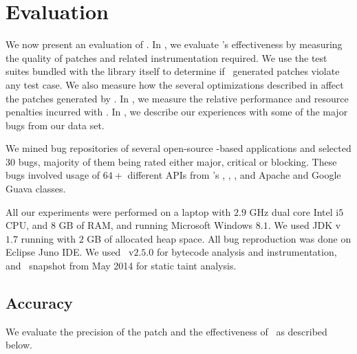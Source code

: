 \section{Evaluation}
\label{sec:results}

We now present an evaluation of \tool. In , we evaluate
\tool's effectiveness by measuring the quality of patches and related
instrumentation required. We use the test suites bundled with the library itself
to determine if \tool\ generated patches violate any test case. We also measure
how the several optimizations described in  affect
the patches generated by \tool. In , we measure the relative
performance and resource penalties incurred with \tool. In
, we describe our experiences with some of the major bugs
from our data set.

 We mined bug repositories of several open-source
\java-based applications and selected $30$ bugs, majority of them being rated
either major, critical or blocking. These bugs involved usage of $64+$ different
APIs from \java's , , , and
Apache  and Google Guava  classes.

 All our experiments were performed on a laptop
with $2.9$ GHz dual core Intel i$5$ CPU, and $8$ GB of RAM, and running
Microsoft Windows $8.1$. We used JDK v$1.7$ running with $2$ GB of allocated
heap space. All bug reproduction was done on Eclipse Juno IDE. We used \soot\
v$2.5.0$ for bytecode analysis and instrumentation, and \infoflow\ snapshot from
May 2014 for static taint analysis.

\subsection{Accuracy}
\label{sub:accuracy}

We evaluate the precision of the patch and the effectiveness of \tool\ as
described below.

